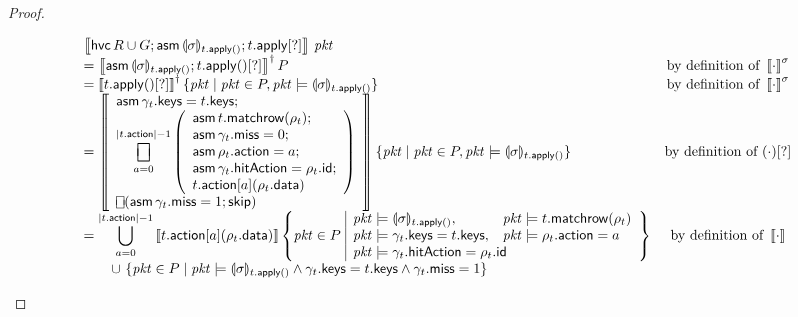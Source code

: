 \documentclass{article}
\newcommand{\pkt}{\mathit{pkt}}
\newcommand{\denote}[1]{\left\llbracket#1\right\rrbracket}
\newcommand{\action}{\mathsf{action}}
\newcommand{\keys}{\mathsf{keys}}
\newcommand{\data}{\mathsf{data}}
\newcommand{\id}{\mathsf{id}}
\newcommand{\hitAction}{\mathsf{hitAction}}
\newcommand{\miss}{\mathsf{miss}}
\newcommand{\assume}{\mathop{\mathsf{asm}}}
\newcommand{\apply}{\mathsf{apply}}
\newcommand{\choiceop}{\rotatebox[origin=c]{90}{$\sqsubset\!\!\!\sqsupset$}}
\newcommand{\choice}{\mathbin{\choiceop}}
\DeclareMathOperator*{\bigchoice}{\scalerel*{\choiceop}{\sum}}
\newcommand{\havoc}[1]{\mathop{\mathsf{hvc}}#1}
\newcommand{\SKIP}{\mathsf{skip}}
\newcommand{\state}[1]{\llparenthesis#1\rrparenthesis}
\newcommand{\instr}{[?]}
\newcommand{\matchrow}{\mathsf{matchrow}}
\theoremstyle{plain}
\theoremstyle{definition}
\theoremstyle{remark}
\begin{document}
\begin{proof}
\begin{enumerate}[align=left]
      \[\begin{array}{lcl}
      \denote{\havoc R \cup G; \assume {\state\sigma_{t.\apply()}}; t.\apply\instr}\,\pkt
      & \\
      = \denote{\assume {\state\sigma_{t.\apply()}}; t.\apply()\instr}^\dagger P
      & \text{by definition of }\denote{\cdot}^\sigma \\
      = \denote{t.\apply()\instr}^\dagger \{\pkt \mid \pkt \in P, \pkt \models \state\sigma_{t.\apply()} \}
      & \text{by definition of }\denote{\cdot}^\sigma \\
      = \denote{  \begin{array}{l} \displaystyle
          \assume \gamma_t.\keys = t.\keys; \\
          \displaystyle \bigchoice_{a=0}^{|t.\action| -1}
          \left(\begin{array}{l}
            \assume t.\matchrow(\rho_t); \\
            \assume \gamma_t.\miss = 0;\\
            \assume \rho_t.\action = a;\\
            \assume \gamma_t.\hitAction = \rho_t.\id;\\
            t.\action[a](\rho_t.\data)
          \end{array}\right) \\
          \choice (\assume \gamma_t.\miss = 1;\SKIP) \\
      \end{array}}
      \{\pkt \mid \pkt \in P, \pkt \models \state\sigma_{t.\apply()} \}
      & \text{by definition of }(\cdot)\instr \\
      = \displaystyle\bigcup_{a=0}^{|t.\action| - 1}
      \denote{t.\action[a](\rho_t.\data)}
      \left\{\pkt \in P\,\, \begin{array}{|ll}
        \pkt \models \state\sigma_{t.\apply()}, & \pkt \models t.\matchrow(\rho_t)\\
        \pkt \models \gamma_t.\keys = t.\keys, & \pkt \models \rho_t.\action = a \\
        \multicolumn{2}{|l}{\pkt \models \gamma_t.\hitAction = \rho_t.\id}
      \end{array}\right\}
      & \text{by definition of }\denote{\cdot}\\
      \qquad \cup\,\,\{\pkt \in P \mid \pkt \models \state\sigma_{t.\apply()} \wedge \gamma_t.\keys = t.\keys \wedge \gamma_t.\miss = 1 \}
      \end{array}\]


\end{enumerate}
\end{proof}
\end{document}
